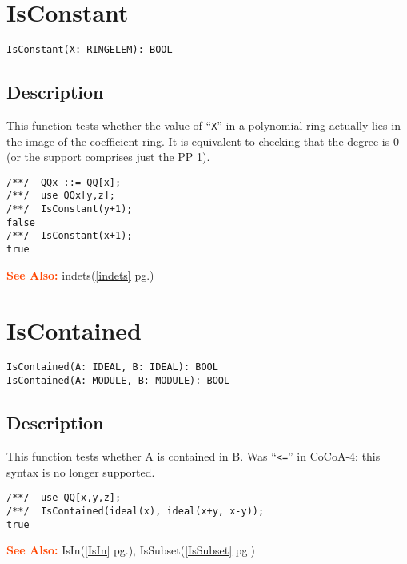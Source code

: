 \documentclass[a4paper]{mybook}
\newenvironment{command}{}{} %
\newcommand\SeeAlso{\par\textcolor{OrangeRed}{\textbf{\large See Also: }}}
\begin{document}
\section{IsConstant}
\label{IsConstant}
\begin{command} %


\begin{Verbatim}[label=syntax, rulecolor=\color{MidnightBlue},
frame=single]
IsConstant(X: RINGELEM): BOOL
\end{Verbatim}


\subsection*{Description}

This function tests whether the value of ``\verb&X&'' in a polynomial ring
actually lies in the image of the coefficient ring.  It is equivalent to
checking that the degree is 0 (or the support comprises just the PP 1).
\begin{Verbatim}[label=example, rulecolor=\color{PineGreen}, frame=single]
/**/  QQx ::= QQ[x];
/**/  use QQx[y,z];
/**/  IsConstant(y+1);
false
/**/  IsConstant(x+1);
true
\end{Verbatim}


\SeeAlso %
  indets(\ref{indets} pg.\pageref{indets})
\end{command} %

\section{IsContained}
\label{IsContained}
\begin{command} %


\begin{Verbatim}[label=syntax, rulecolor=\color{MidnightBlue},
frame=single]
IsContained(A: IDEAL, B: IDEAL): BOOL
IsContained(A: MODULE, B: MODULE): BOOL
\end{Verbatim}


\subsection*{Description}

This function tests whether A is contained in B.
Was ``\verb&<=&'' in CoCoA-4: this syntax is no longer supported.
\begin{Verbatim}[label=example, rulecolor=\color{PineGreen}, frame=single]
/**/  use QQ[x,y,z];
/**/  IsContained(ideal(x), ideal(x+y, x-y));
true
\end{Verbatim}


\SeeAlso %
  IsIn(\ref{IsIn} pg.\pageref{IsIn}), 
    IsSubset(\ref{IsSubset} pg.\pageref{IsSubset})
\end{command} %
\end{document}
